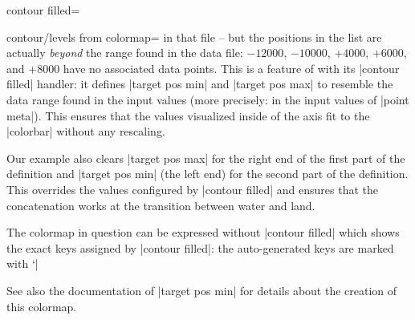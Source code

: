 {{\begin{plottype}[/pgfplots]{
    contour filled=\textcolor{black}{}%
}
\begin{pgfplotskey}{contour/levels from colormap=}
        in that file -- but the positions in the list are actually
        \emph{beyond} the range found in the data file: $-12000$, $-10000$,
        $+4000$, $+6000$, and $+8000$ have no associated data points. This is a
        feature of \PGFPlots{} with its |contour filled| handler: it defines
        |target pos min| and |target pos max| to resemble the data range found
        in the input values (more precisely: in the input values of
        |point meta|). This ensures that the values visualized inside of the
        axis fit to the |colorbar| without any rescaling.

        Our example also clears |target pos max| for the right end of the first
        part of the definition and |target pos min| (the left end) for the
        second part of the definition. This overrides the values configured by
        |contour filled| and ensures that the concatenation works at the
        transition between water and land.

        The colormap in question can be expressed without |contour filled|
        which shows the exact keys assigned by |contour filled|: the
        auto-generated keys are marked with `|%
\begin{codeexample}[]
\pgfplotscolorbardrawstandalone[
    colormap={whiteblue}{color=(blue) color=(white)},
    colormap={gb}{color=(green)
        color=(yellow) color=(brown)},
    colorbar style={minor x tick num=1},
    point meta min=-7052,               %
    point meta max=2895,                %
    of colormap/target pos min*=-7052,  %
    of colormap/target pos max*=2895,   %
    of colormap/sample for=const,       %
    colormap access=const,              %
    colormap={CM}{
        of colormap={
            whiteblue,
            target pos max=,
            target pos={-12000,-10000,-6000,-5000,
              -3000,-1000,-750,-500,-250,-100,-50,0}
        },
        of colormap={
            gb,
            target pos min=,
            target pos={10,100,200,500,1000,1100,
                1200,1500,2000,4000,6000,8000}
        },
    },
]
\end{codeexample}
        \noindent See also the documentation of |target pos min| for details
        about the creation of this colormap.


\end{pgfplotskey}
\end{plottype}}}
